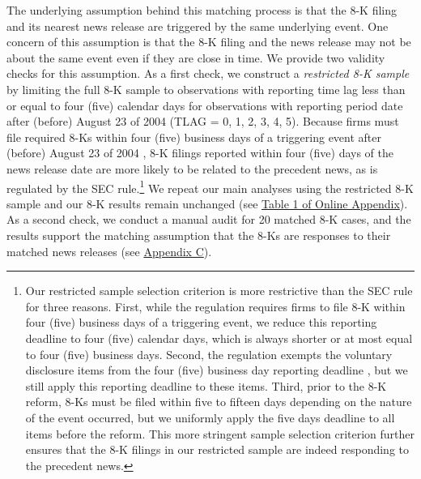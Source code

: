 \documentclass[letterpaper,12pt]{article}
\begin{document}
\begin{spacing}{1.5}
The underlying assumption behind this matching process is that the 8-K filing and its nearest news release are triggered by the same underlying event. One concern of this assumption is that the 8-K filing and the news release may not be about the same event even if they are close in time. We provide two validity checks for this assumption. As a first check, we construct a \textit{restricted 8-K sample} by limiting the full 8-K sample to observations with reporting time lag less than or equal to four (five) calendar days for observations with reporting period date after (before) August 23 of 2004 (TLAG = 0, 1, 2, 3, 4, 5). Because firms must file required 8-Ks within four (five) business days of a triggering event after (before) August 23 of 2004 \cite{secFinalRuleAdditional2004}, 8-K filings reported within four (five) days of the news release date are more likely to be related to the precedent news, as is regulated by the SEC rule.\footnote{Our restricted sample selection criterion is more restrictive than the SEC rule for three reasons. First, while the regulation requires firms to file 8-K within four (five) business days of a triggering event, we reduce this reporting deadline to four (five) calendar days, which is always shorter or at most equal to four (five) business days. Second, the regulation exempts the voluntary disclosure items from the four (five) business day reporting deadline \cite{heMeasuringDisclosureUsing2020}, but we still apply this reporting deadline to these items. Third, prior to the 8-K reform, 8-Ks must be filed within five to fifteen days depending on the nature of the event occurred, but we uniformly apply the five days deadline to all items before the reform. This more stringent sample selection criterion further ensures that the 8-K filings in our restricted sample are indeed responding to the precedent news.} We repeat our main analyses using the restricted 8-K sample and our 8-K results remain unchanged (see \hyperref[oat1]{Table 1 of Online Appendix}). As a second check, we conduct a manual audit for 20 matched 8-K cases, and the results support the matching assumption that the 8-Ks are responses to their matched news releases (see \hyperref[appc]{Appendix C}).


\end{spacing}
\end{document}
